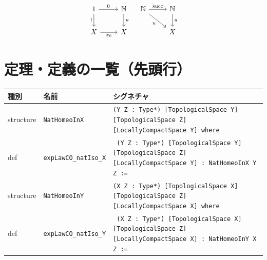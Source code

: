 \documentclass[12pt]{article}
\theoremstyle{definition}
\begin{document}
\[
\begin{tikzcd}
1 \arrow[r, "0"] \arrow[d, "!"'] & \mathbb{N} \arrow[d, "u"] \\
X \arrow[r, "x_0"'] & X
\end{tikzcd}
\quad
\begin{tikzcd}
\mathbb{N} \arrow[r, "\mathrm{succ}"] \arrow[dr, swap, "u"] & \mathbb{N} \arrow[d, "u"] \\
& X
\end{tikzcd}
\]


\section*{定理・定義の一覧（先頭行）}
\begin{center}
\begin{tabular}{lll}
\textbf{種別} & \textbf{名前} & \textbf{シグネチャ} \\ \hline
structure & \texttt{NatHomeoInX} & \texttt{(Y Z : Type*) [TopologicalSpace Y] [TopologicalSpace Z] [LocallyCompactSpace Y] where} \\
def & \texttt{expLawCO\_natIso\_X} & \texttt{ (Y Z : Type*) [TopologicalSpace Y] [TopologicalSpace Z] [LocallyCompactSpace Y] : NatHomeoInX Y Z :=} \\
structure & \texttt{NatHomeoInY} & \texttt{(X Z : Type*) [TopologicalSpace X] [TopologicalSpace Z] [LocallyCompactSpace X] where} \\
def & \texttt{expLawCO\_natIso\_Y} & \texttt{ (X Z : Type*) [TopologicalSpace X] [TopologicalSpace Z] [LocallyCompactSpace X] : NatHomeoInY X Z :=} \\
\end{tabular}
\end{center}
\end{document}
